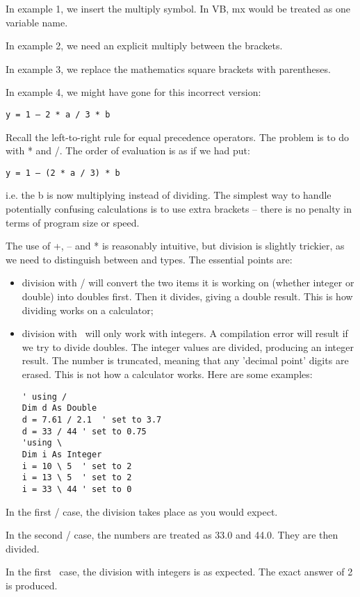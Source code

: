		In example 1, we insert the multiply symbol. In VB, mx would be treated as one variable name.

		In example 2, we need an explicit multiply between the brackets.

		In example 3, we replace the mathematics square brackets with parentheses.
		
		In example 4, we might have gone for this incorrect version:
		\begin{lstlisting}
y = 1 – 2 * a / 3 * b
		\end{lstlisting}
		Recall the left-to-right rule for equal precedence operators. The problem is to do with * and /. The order of evaluation is as if we had put:
		\begin{lstlisting}
y = 1 – (2 * a / 3) * b
		\end{lstlisting}
		i.e. the b is now multiplying instead of dividing. The simplest way to handle potentially confusing calculations is to use extra brackets – there is no penalty in terms of program size or speed.
		
		The use of +, – and * is reasonably intuitive, but division is slightly trickier, as we need to distinguish between  and  types. The essential points are:
		\begin{itemize}
			\item division with / will convert the two items it is working on (whether integer or double) into doubles first. Then it divides, giving a double result. This is how dividing works on a calculator;
			\item division with \ will only work with integers. A compilation error will result if we try to divide doubles. The integer values are divided, producing an integer result. The number is truncated, meaning that any 'decimal point' digits are erased. This is not how a calculator works.
				Here are some examples:
				\begin{lstlisting}
' using /
Dim d As Double
d = 7.61 / 2.1	' set to 3.7
d = 33 / 44	' set to 0.75
'using \
Dim i As Integer
i = 10 \ 5	' set to 2
i = 13 \ 5	' set to 2
i = 33 \ 44	' set to 0
				\end{lstlisting}
		\end{itemize}

In the first / case, the division takes place as you would expect.

In the second / case, the numbers are treated as 33.0 and 44.0. They are then divided.

In the first \ case, the division with integers is as expected. The exact answer of 2 is produced.


